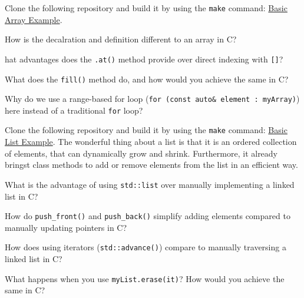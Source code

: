 \begin{challenge}
    \begin{task}
    Clone the following repository and build it by using the \texttt{make} command: \href{https://github.com/STEMgraph/98500992-3b1e-4fc2-ae52-4ef2361553a6}{Basic Array Example}.
        \begin{questions}
            \item How is the decalration and definition different to an array in C?
            \item hat advantages does the \texttt{.at()} method provide over direct indexing with \texttt{[]}?
            \item What does the \texttt{fill()} method do, and how would you achieve the same in C?
            \item Why do we use a range-based for loop (\texttt{for (const auto& element : myArray)}) here instead of a traditional \texttt{for} loop?
        \end{questions}
    \end{task}


    \begin{task}
    Clone the following repository and build it by using the \texttt{make} command: \href{https://github.com/STEMgraph/ace16f79-8c02-4c81-8b32-ba60083ba75f}{Basic List Example}.
    The wonderful thing about a list is that it is an ordered collection of elements, that can dynamically grow and shrink.
    Furthermore, it already bringst class methods to add or remove elements from the list in an efficient way.
        \begin{questions}
            \item What is the advantage of using \texttt{std::list} over manually implementing a linked list in C?
            \item How do \texttt{push_front()} and \texttt{push_back()} simplify adding elements compared to manually updating pointers in C?
            \item How does using iterators (\texttt{std::advance()}) compare to manually traversing a linked list in C?
            \item What happens when you use \texttt{myList.erase(it)}? How would you achieve the same in C?
        \end{questions}
    \end{task}


\end{challenge}
